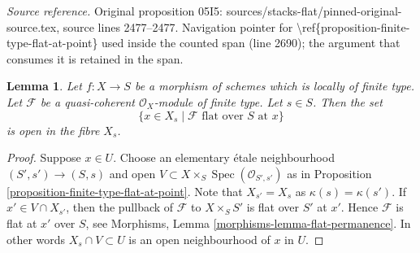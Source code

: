 \documentclass[10pt,a4paper]{amsart}
\theoremstyle{plain}
\newtheorem{lemma}[subsection]{Lemma}
\theoremstyle{definition}
\theoremstyle{remark}
\numberwithin{equation}{subsection}
\def\Spec{\mathop{\mathrm{Spec}}}
\begin{document}
\noindent\textit{Source reference.} Original proposition 05I5: sources/stacks-flat/pinned-original-source.tex, source lines 2477--2477. Navigation pointer for \textbackslash{}ref\{proposition-finite-type-flat-at-point\} used inside the counted span (line 2690); the argument that consumes it is retained in the span.\par\medskip
\begin{lemma}
\label{lemma-open-in-fibre-where-flat}
Let $f : X \to S$ be a morphism of schemes which is locally of finite type.
Let $\mathcal{F}$ be a quasi-coherent $\mathcal{O}_X$-module of finite type.
Let $s \in S$. Then the set
$$
\{x \in X_s \mid \mathcal{F} \text{ flat over }S\text{ at }x\}
$$
is open in the fibre $X_s$.
\end{lemma}

\begin{proof}
Suppose $x \in U$. Choose an elementary \'etale neighbourhood
$(S', s') \to (S, s)$ and open
$V \subset X \times_S \Spec(\mathcal{O}_{S', s'})$ as in
Proposition \ref{proposition-finite-type-flat-at-point}.
Note that $X_{s'} = X_s$ as $\kappa(s) = \kappa(s')$.
If $x' \in V \cap X_{s'}$, then the pullback of $\mathcal{F}$ to
$X \times_S S'$ is flat over $S'$ at $x'$. Hence $\mathcal{F}$ is
flat at $x'$ over $S$, see
Morphisms, Lemma \ref{morphisms-lemma-flat-permanence}.
In other words $X_s \cap V \subset U$ is an open neighbourhood
of $x$ in $U$.
\end{proof}
\end{document}
